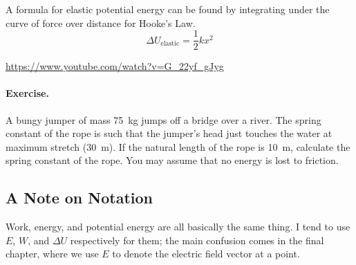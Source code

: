 \documentclass[a4paper]{amsbook}
\begin{document}
A formula for elastic potential energy can be found by integrating under the curve of force over distance for Hooke's Law.
\begin{equation}
  \Delta U_{\text{elastic}} = \frac{1}{2} kx^2
\end{equation}

\begin{center}
\begin{tcolorbox}[width=0.8\textwidth,colback={red},title={\textbf{Go and watch...}},colbacktitle=yellow,coltitle=blue]
  \textcolor{white}{\url{https://www.youtube.com/watch?v=G_22yf_gJyg}}
\end{tcolorbox}
\end{center}

\paragraph{Exercise.} A bungy jumper of mass \SI{75}{\kilo\gram} jumps off a bridge over a river. The spring constant
of the rope is such that the jumper's head just touches the water at maximum stretch (\SI{30}{\metre}). If the natural
length of the rope is \SI{10}{\metre}, calculate the spring constant of the rope. You may assume that no energy is lost
to friction.

\subsection{A Note on Notation}
Work, energy, and potential energy are all basically the same thing. I tend to use $ E $, $ W $, and $ \Delta U $ respectively
for them; the main confusion comes in the final chapter, where we use $ E $ to denote the electric field vector at a point.
\end{document}
